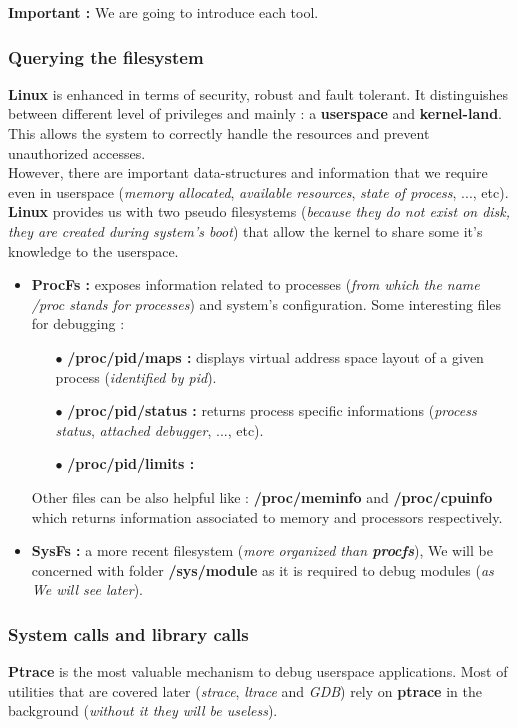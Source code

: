 \textbf{\color{red}Important : } We are going to introduce each tool.
\subsubsection{Querying the filesystem}
\textbf{Linux} is enhanced in terms of security, robust and fault tolerant. It distinguishes between different level of privileges
and mainly : a \textbf{userspace} and \textbf{kernel-land}. This allows the system to correctly handle the resources and prevent unauthorized accesses.\\

However, there are important data-structures and information that we require even in userspace (\emph{memory allocated}, \emph{available resources}, \emph{state of process}, ..., etc). \textbf{Linux} provides us with two pseudo filesystems (\textit{because they do not exist on disk, they are created during system's boot}) that allow the kernel to share some it's knowledge to the userspace.    

\begin{itemize}
	\item \textbf{ProcFs : } exposes information related to processes (\emph{from which the name /proc stands for processes}) and system's configuration. Some interesting files for debugging :
		\begin{itemize}
			\item[$\bullet$] \textbf{/proc/pid/maps : } displays virtual address space layout of a given process (\textit{identified by pid}).
			\item[$\bullet$] \textbf{/proc/pid/status : } returns process specific informations (\emph{process status}, \emph{{\color{red}attached debugger}}, ..., etc).
			\item[$\bullet$] \textbf{/proc/pid/limits : }						
		\end{itemize}
Other files can be also helpful like : \textbf{/proc/meminfo} and \textbf{/proc/cpuinfo} which returns information associated to memory and processors respectively.	
	\item \textbf{SysFs : } a more recent filesystem (\emph{more organized than \textbf{procfs}}), We will be concerned with folder \textbf{/sys/module} as it is required to debug modules (\textit{as We will see later}). 
	
	
\end{itemize}

\subsubsection{System calls and library calls}
\textbf{Ptrace} is the most valuable mechanism to debug userspace applications. Most of utilities that are covered later (\emph{strace}, \emph{ltrace} and \emph{GDB}) rely on \textbf{ptrace} in the background (\emph{without it they will be useless}).\\

